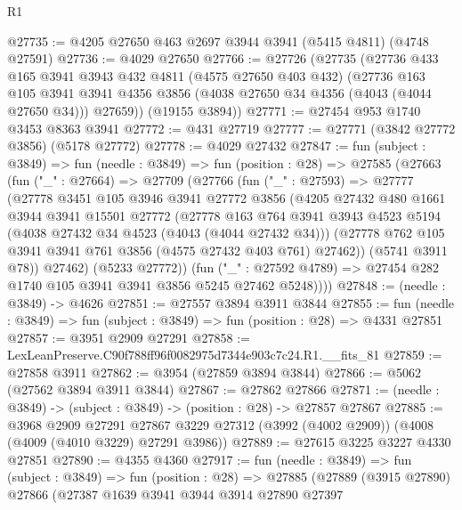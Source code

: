 \begin{lexlean}{R1}
\begin{coremodule}
@27735 := @4205 @27650 @463 @2697 @3944 @3941 (@5415 @4811) (@4748 @27591)
@27736 := @4029 @27650
@27766 := @27726
    (@27735
      (@27736
        @433
        @165
        @3941
        @3943
        @432
        @4811
        (@4575 @27650 @403 @432)
        (@27736
          @163
          @105
          @3941
          @3941
          @4356
          @3856
          (@4038 @27650 @34 @4356 (@4043 (@4044 @27650 @34)))
          @27659))
      (@19155 @3894))
@27771 := @27454 @953 @1740 @3453 @8363 @3941
@27772 := @431 @27719
@27777 := @27771 (@3842 @27772 @3856) (@5178 @27772)
@27778 := @4029 @27432
@27847 := fun (subject : @3849) =>
  fun (needle : @3849) =>
  fun (position : @28) =>
  @27585
    (@27663
      (fun ("_" : @27664) =>
      @27709
        (@27766
          (fun ("_" : @27593) =>
          @27777
            (@27778
              @3451
              @105
              @3946
              @3941
              @27772
              @3856
              (@4205
                @27432
                @480
                @1661
                @3944
                @3941
                @15501
                @27772
                (@27778
                  @163
                  @764
                  @3941
                  @3943
                  @4523
                  @5194
                  (@4038 @27432 @34 @4523 (@4043 (@4044 @27432 @34)))
                  (@27778 @762 @105 @3941 @3941 @761 @3856 (@4575 @27432 @403 @761) @27462))
                (@5741 @3911 @78))
              @27462)
            (@5233 @27772))
          (fun ("_" : @27592 @4789) =>
          @27454 @282 @1740 @105 @3941 @3941 @3856 @5245 @27462 @5248))))
@27848 := (needle : @3849) -> @4626
@27851 := @27557 @3894 @3911 @3844
@27855 := fun (needle : @3849) => fun (subject : @3849) => fun (position : @28) => @4331 @27851
@27857 := @3951 @2909 @27291
@27858 := LexLeanPreserve.C90f788ff96f0082975d7344e903c7c24.R1.__fits_81
@27859 := @27858 @3911
@27862 := @3954 (@27859 @3894 @3844)
@27866 := @5062 (@27562 @3894 @3911 @3844)
@27867 := @27862 @27866
@27871 := (needle : @3849) -> (subject : @3849) -> (position : @28) -> @27857 @27867
@27885 := @3968
    @2909
    @27291
    @27867
    @3229
    @27312
    (@3992 (@4002 @2909))
    (@4008 (@4009 (@4010 @3229) @27291 @3986))
@27889 := @27615 @3225 @3227 @4330 @27851
@27890 := @4355 @4360
@27917 := fun (needle : @3849) =>
  fun (subject : @3849) =>
  fun (position : @28) =>
  @27885
    (@27889
      (@3915 @27890)
      @27866
      (@27387
        @1639
        @3941
        @3944
        @3914
        @27890
        @27397

\end{coremodule}
\end{lexlean}

